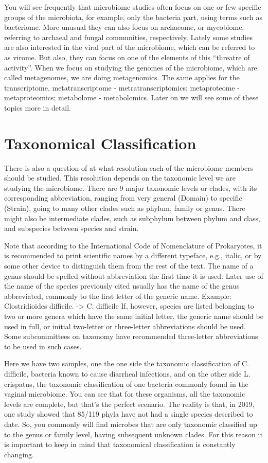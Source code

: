 You will see frequently that microbiome studies often focus on one or few specific groups of the microbiota, for example, 
only the bacteria part, using terms such as bacteriome. More unusual they can also focus on archaeome, or mycobiome, 
referring to archaeal and fungal communities, respectively. Lately some studies are also interested in the viral part 
of the microbiome, which can be referred to as virome. But also, they can focus on one of the elements of this 
“threatre of activity”. When we focus on studying the genomes of the microbiome, which are called metagenomes, we are 
doing metagenomics. The same applies for the transcriptome, metatranscriptome - metratranscriptomics; 
metaproteome - metaproteomics; metabolome - metabolomics. Later on we will see some of these topics more in detail.

\section{Taxonomical Classification}
There is also a question of at what resolution each of the microbiome members should be studied. This resolution depends 
on the taxonomic level we are studying the microbiome. There are 9 major taxonomic levels or clades, with its corresponding 
abbreviation, ranging from very general (Domain) to specific (Strain), going to many other clades such as phylum, family or genus. 
There might also be intermediate clades, such as subphylum between phylum and class, and subspecies between species and strain.


Note that according to the International Code of Nomenclature of Prokaryotes, it is recommended to print scientific names 
by a different typeface, e.g., italic, or by some other device to distinguish them from the rest of the text. The name of a 
genus should be spelled without abbreviation the first time it is used. Later use of the name of the species previously cited 
usually has the name of the genus abbreviated, commonly to the first letter of the generic name. 
Example: Clostridioides difficile. -> C. difficile If, however, species are listed belonging to two or more genera which have 
the same initial letter, the generic name should be used in full, or initial two-letter or three-letter abbreviations 
should be used. Some subcommittees on taxonomy have recommended three-letter abbreviations to be used in such cases.


Here we have two samples, one the one side the taxonomic classification of C. difficile, bacteria known to cause diarrheal 
infections, and on the other side L. crispatus, the taxonomic classification of one bacteria commonly found in the vaginal 
microbiome. You can see that for these organisms, all the taxonomic levels are complete, but that's the perfect scenario. 
The reality is that, in 2019, one study showed that 85/119 phyla have not had a single species described to date. So, 
you commonly will find microbes that are only taxonomic classified up to the genus or family level, having subsequent 
unknown clades. For this reason it is important to keep in mind that taxonomical classification is constantly changing.

